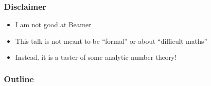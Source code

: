 
\begin{frame}
\frametitle{Disclaimer}

\begin{itemize}
  \item I am not good at Beamer
  \item This talk is not meant to be ``formal'' or about ``difficult maths''
  \item Instead, it is a taster of some analytic number theory!
\end{itemize}

\end{frame}

\begin{frame}
\frametitle{Outline}
\tableofcontents
\end{frame}
